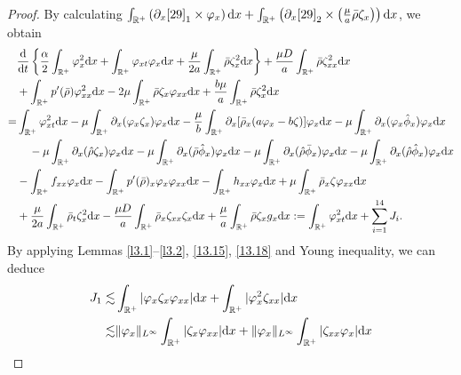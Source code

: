\documentclass[11pt]{article}
\theoremstyle{plain}
\numberwithin{equation}{section}
\begin{document}
	\begin{proof}
By calculating $\int_{\mathbb{R}^+}\left(\partial_x\eqref{29}_1\times\varphi_x\right){\rm d}x+\int_{\mathbb{R}^+}\left(\partial_x\eqref{29}_2\times\left(\frac{\mu}{a}\bar\rho\zeta_x\right)\right){\rm d}x$, we obtain
\begin{align}\label{13.47}
			&\frac{{\rm d}}{{\rm d}t}\left\{\frac{\alpha}{2}\int_{\mathbb{R}^+}\varphi_x^2{\rm d}x+\int_{\mathbb{R}^+}^{}\varphi_{xt}\varphi_x{\rm d}x+\frac{\mu}{2a}\int_{\mathbb{R}^+}^{}\bar\rho\zeta_x^2{\rm d}x\right\}+\frac{\mu D}{a}\int_{\mathbb{R}^+}^{}\bar\rho\zeta_{xx}^2{\rm d}x	\notag\\
			&+\int_{\mathbb{R}^+}^{}p^{\prime}(\bar\rho)\varphi_{xx}^2{\rm d}x-2\mu\int_{\mathbb{R}^+}^{}\bar\rho\zeta_x\varphi_{xx}{\rm d}x+\frac{b\mu}{a}\int_{\mathbb{R}^+}^{}\bar\rho\zeta_x^2{\rm d}x\notag\\
			=&\int_{\mathbb{R}^+}\varphi_{xt}^2{\rm d}x-\mu\int_{\mathbb{R}^+}^{}\partial_x(\varphi_{x}\zeta_x)\varphi_{x} {\rm d}x-\frac{\mu}{b}\int_{\mathbb{R}^+}^{}\partial_x[\bar\rho_x(a\varphi_{x}-b\zeta)]\varphi_{x}{\rm d}x-\mu\int_{\mathbb{R}^+}^{}\partial_x(\varphi_{x}\hat\phi_x)\varphi_{x}{\rm d}x\notag\\
			&\;\;\;\;-\mu\int_{\mathbb{R}^+}^{}\partial_x(\hat\rho\zeta_x)\varphi_{x}{\rm d}x	-\mu\int_{\mathbb{R}^+}^{}\partial_x(\bar\rho\hat\phi_x)\varphi_{x}{\rm d}x-\mu\int_{\mathbb{R}^+}^{}\partial_x(\hat\rho\bar\phi_x)\varphi_{x}{\rm d}x	-\mu\int_{\mathbb{R}^+}^{}\partial_x(\hat\rho\hat\phi_x)\varphi_{x}{\rm d}x\notag\\
			&
			-\int_{\mathbb{R}^+}^{}f_{xx}\varphi_{x}{\rm d}x-\int_{\mathbb{R}^+}^{}p^{\prime}(\bar\rho)_x\varphi_{x}\varphi_{xx}{\rm d}x
			-\int_{\mathbb{R}^+}^{}h_{xx}\varphi_{x}{\rm d}x
			+\mu\int_{\mathbb{R}^+}^{}\bar\rho_x\zeta\varphi_{xx}{\rm d}x\notag\\ 
			&+\frac{\mu}{2a}\int_{\mathbb{R}^+}^{}\bar\rho_t\zeta_x^2{\rm d}x-\frac{\mu D}{a}\int_{\mathbb{R}^+}^{}\bar\rho_x\zeta_{xx}\zeta_{x} {\rm d}x+\frac{\mu}{a}\int_{\mathbb{R}^+}^{}\bar\rho\zeta_{x}g_x {\rm d}x:=\int_{\mathbb{R}^+}\varphi_{xt}^2{\rm d}x+\sum_{i=1}^{14}J_i.
		\end{align}
By applying Lemmas \ref{l3.1}--\ref{l3.2}, \eqref{13.15}, \eqref{13.18} and Young inequality, we can deduce
\begin{align}\label{13.48}
			J_{1}\lesssim&\int_{\mathbb{R}^+}|\varphi_x\zeta_x\varphi_{xx}|{\rm d}x+\int_{\mathbb{R}^+}|\varphi_x^2\zeta_{xx}|{\rm d}x\notag\\
			\lesssim&\|\varphi_x\|_{L^{\infty}}\int_{\mathbb{R}^+}|\zeta_x\varphi_{xx}|{\rm d}x+\|\varphi_x\|_{L^{\infty}}\int_{\mathbb{R}^+}|\zeta_{xx}\varphi_{x}|{\rm d}x\notag\\

\end{align}
\end{proof}
\end{document}
